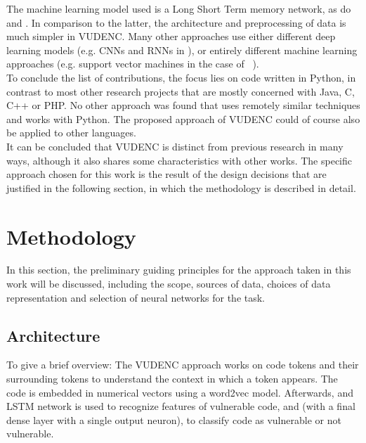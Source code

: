 \documentclass[
	a4paper,
	pagesize,
	pdftex,
	12pt,
	twoside, %
	BCOR=5mm, %
	ngerman,
	fleqn,
	final,
	]{scrartcl}
\begin{document}
The machine learning model used is a Long Short Term memory network, as do \cite{Li.2018} and \cite{Dam.2017}. In comparison to the latter, the architecture and preprocessing of data is much simpler in VUDENC. Many other approaches use either different deep learning models (e.g. CNNs and RNNs in \cite{Russell.2018}), or entirely different machine learning approaches (e.g. support vector machines in the case of ~\cite{Pang.2015}).\\
To conclude the list of contributions, the focus lies on code written in Python, in contrast to most other research projects that are mostly concerned with Java, C, C++ or PHP. No other approach was found that uses remotely similar techniques and works with Python. The proposed approach of VUDENC could of course also be applied to other languages.\\
It can be concluded that VUDENC is distinct from previous research in many ways, although it also shares some characteristics with other works. The specific approach chosen for this work is the result of the design decisions that are justified in the following section, in which the methodology is described in detail.


\newpage
\section{Methodology}\label{Methodology}
In this section, the  preliminary guiding principles for the approach taken in this work will be discussed, including the scope, sources of data, choices of data representation and selection of neural networks for the task. 

\subsection{Architecture}
To give a brief overview: The VUDENC approach works on code tokens and their surrounding tokens to understand the context in which a token appears. The code is embedded in numerical vectors using a word2vec model. Afterwards, and LSTM network is used to recognize features of vulnerable code, and (with a final dense layer with a single output neuron), to classify code as vulnerable or not vulnerable.  
 
\end{document}
